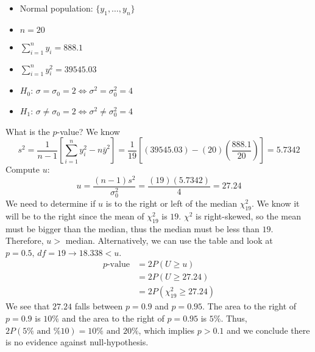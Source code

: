 \begin{exbox}
    \begin{example}\label{small u variance} $ \; $
        \begin{itemize}
            \item Normal population: $ \{y_1,\ldots ,y_n\} $
            \item $ n=20 $
            \item $ \sum\limits_{i=1}^{n} y_i=888.1 $
            \item $ \sum\limits_{i=1}^{n} y_i^2=39545.03 $
            \item $ H_0 $: $ \sigma=\sigma_0=2 \iff \sigma^2=\sigma_0^2=4 $
            \item $ H_1 $: $ \sigma\neq \sigma_0=2 \iff \sigma^2\neq \sigma_0^2=4 $
        \end{itemize}
        What is the $ p $-value?
        We know
        \[ s^2=\frac{1}{n-1} \left[ \sum\limits_{i=1}^{n} y_i^2-n\bar{y}^2 \right]
            =
            \frac{1}{19} \left[ (39545.03)-(20)\left( \frac{888.1}{20}  \right)  \right]
            =
            5.7342 \]
        Compute $ u $:
        \[ u=\frac{(n-1)s^2}{\sigma_0^2}
            =
            \frac{(19)(5.7342)}{4}
            =
            27.24 \]
        We need to determine if $ u $ is to the right or left of the median $ \chi^2_{19} $.
        We know it will be to the right since the mean of $ \chi^2_{19} $ is $ 19 $.
        $ \chi^2 $ is right-skewed, so the mean must be bigger than the median,
        thus the median must be less than $ 19 $. Therefore, $ u> $ median. Alternatively,
        we can use the table and look at $ p=0.5,\,df=19\rightarrow 18.338<u $.
        \begin{align*}
            p\text{-value}
             & =2P(U\geqslant u)               \\
             & =2P(U\geqslant 27.24)           \\
             & =2P(\chi^2_{19}\geqslant 27.24)
        \end{align*}
        We see that $ 27.24 $ falls between $ p=0.9 $ and $ p=0.95 $. The area to the right of
        $ p=0.9 $ is $ 10\% $ and the area to the right of $ p=0.95 $ is $ 5\% $.
        Thus, $ 2P(5\%\text{ and }\% 10)=10\%\text{ and } 20\% $,
        which implies $ p>0.1 $ and we conclude there is no evidence against null-hypothesis.
    \end{example}
\end{exbox}
